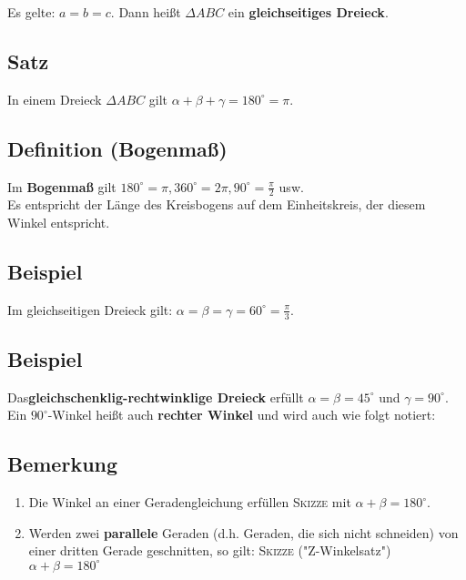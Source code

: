 	Es gelte: $a=b=c$. Dann heißt $\Delta ABC$ ein \textbf{gleichseitiges Dreieck}.
	
	
\subsection[Der Innenwinkelsummensatz]{Satz}

	In einem Dreieck $\Delta ABC$ gilt $\alpha+\beta+\gamma=180^{\circ}=\pi$.
	
	
\subsection[Das Bogenmaß]{Definition (Bogenmaß)}

	Im \textbf{Bogenmaß} gilt $180^{\circ}=\pi,360^{\circ}=2\pi,90^{\circ}=\frac{\pi}{2}$ usw.\\
	Es entspricht der Länge des Kreisbogens auf dem Einheitskreis, der diesem Winkel entspricht.
	
	
\subsection{Beispiel}

	Im gleichseitigen Dreieck gilt: $\alpha=\beta=\gamma=60^{\circ}=\frac{\pi}{3}$.
	
	
\subsection[Das gleichschenklig-rechtwinklige Dreieck]{Beispiel}

	Das\textbf{gleichschenklig-rechtwinklige Dreieck} erfüllt $\alpha=\beta=45^{\circ}$ und $\gamma=90^{\circ}$.\\
	Ein $90^{\circ}$-Winkel heißt auch \textbf{rechter Winkel} und wird auch wie folgt notiert: 
	
	
\subsection{Bemerkung}

	\begin{enumerate}
	\item Die Winkel an einer Geradengleichung erfüllen \textsc{Skizze} mit $\alpha+\beta=180^{\circ}$.
	\item Werden zwei \textbf{parallele} Geraden (d.h. Geraden, die sich nicht schneiden) von einer dritten
	Gerade geschnitten, so gilt: \textsc{Skizze} ("Z-Winkelsatz") $\alpha+\beta=180^{\circ}$
	\end{enumerate}
	
